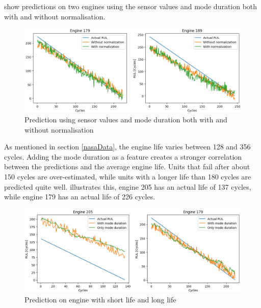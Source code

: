 \documentclass[english, a4paper]{report}
\begin{document}
{{{{                 show predictions on two engines using the sensor values and mode duration both with and without normalisation.
            
                \begin{figure}[H]
                    \centering \includegraphics[width=1\linewidth]{PredictionNASA3}
                    \caption{Prediction using sensor values and mode duration both with and without normalisation}
                    \label{fig:NASAPredWithNorm}
                \end{figure}
            
                As mentioned in section \ref{nasaData}, the engine life varies between 128 and 356 cycles. Adding the mode duration as a feature creates a stronger correlation between the predictions and the average engine life. Units that fail after about 150 cycles are over-estimated, while units with a longer life than 180 cycles are predicted quite well.  illustrates this, engine 205 has an actual life of 137 cycles, while engine 179 has an actual life of 226 cycles.
            
                \begin{figure}[H]
                    \centering \includegraphics[width=1\linewidth]{PredictionNASA4}
                    \caption{Prediction on engine with short life and long life}
                    \label{fig:NASAPredLongandShort}
                \end{figure}
                
}}}}
\end{document}
